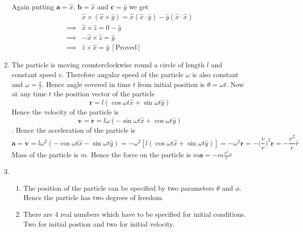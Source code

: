 \documentclass{article}
\newcommand{\bma}{\boldsymbol{a}}
\newcommand{\bmb}{\boldsymbol{b}}
\newcommand{\bmc}{\boldsymbol{c}}
\newcommand{\bmr}{\boldsymbol{r}}
\newcommand{\bmv}{\boldsymbol{v}}
\begin{document}
\begin{enumerate}
\hspace{1cm}Again putting $\bma=\hat{x}$, $\bmb=\hat{x}$ and $\bmc=\hat{y}$ we get\begin{align*}
	& \hat{x}\times(\hat{x}\times\hat{y})=\hat{x}(\hat{x}\cdot\hat{y})-\hat{y}(\hat{x}\cdot\hat{x})\\
	\implies & \hat{x}\times \hat{z}=0-\hat{y}\\
	\implies & -\hat{x}\times \hat{z}=\hat{y}\\
	\implies & \hat{z}\times \hat{x}=\hat{y}\ [\text{Proved}]
\end{align*}
\item The particle is moving counterclockwise round a circle of length $l$ and constant speed $v$. Therefore angular speed of the particle $\omega$ is also constant and $\omega=\frac{v}{l}$. Hence angle covered in time $t$ from initial position is $\theta=\omega t$. Now at any time $t$ the position vector of the particle$$\bmr=l(\cos\omega t\hat{x}+\sin\omega t\hat{y})$$ Hence the velocity of the particle is $$\bmv=\dot{\bmr}=l\omega(-\sin\omega t\hat{x}+\cos\omega t\hat{y})$$. Hence the acceleration of the particle is $$\bma=\dot{\bmv}=l\omega^2(-\cos\omega t\hat{x}-\sin\omega t\hat{y})=-\omega^2[l(\cos\omega t\hat{x}+\sin\omega t\hat{y})]=-\omega^2\bmr=-\Bigg(\frac{v}{r}\Bigg)^2\bmr=-\frac{v^2}{r}\hat{r}$$Mass of the particle is $m$. Hence the force on the particle is $m\bma=-m\frac{v^2}{r}\hat{r}$
\item \begin{enumerate}
	\item The position of the particle can be specified by two parameters $\theta $ and $\phi$. Hence the particle has two degrees of freedom.

\item There are 4  real numbers which have to be specified for initial conditions. Two for initial postion and two for initial velocity.


\end{enumerate}
\end{enumerate}
\end{document}
